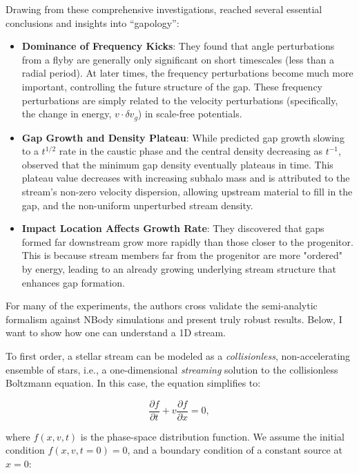             Drawing from these comprehensive investigations, \citet{2016MNRAS.457.3817S} reached several essential conclusions and insights into ``gapology'':
            \begin{itemize}
                \item \textbf{Dominance of Frequency Kicks}: They found that angle perturbations from a flyby are generally only significant on short timescales (less than a radial period). At later times, the frequency perturbations become much more important, controlling the future structure of the gap. These frequency perturbations are simply related to the velocity perturbations (specifically, the change in energy, $v \cdot \delta v_g$) in scale-free potentials.
                \item \textbf{Gap Growth and Density Plateau}: While \citet{2015MNRAS.450.1136E} predicted gap growth slowing to a $t^{1/2}$ rate in the caustic phase and the central density decreasing as $t^{-1}$, \citet{2016MNRAS.457.3817S} observed that the minimum gap density eventually plateaus in time. This plateau value decreases with increasing subhalo mass and is attributed to the stream's non-zero velocity dispersion, allowing upstream material to fill in the gap, and the non-uniform unperturbed stream density.
                \item \textbf{Impact Location Affects Growth Rate}: They discovered that gaps formed far downstream grow more rapidly than those closer to the progenitor. This is because stream members far from the progenitor are more "ordered" by energy, leading to an already growing underlying stream structure that enhances gap formation.
            \end{itemize}
            For many of the experiments, the authors cross validate the semi-analytic formalism against NBody simulations and present truly robust results. Below, I want to show how one can understand a 1D stream. 


            To first order, a stellar stream can be modeled as a \textit{collisionless}, non-accelerating ensemble of stars, i.e., a one-dimensional \textit{streaming} solution to the collisionless Boltzmann equation. In this case, the equation simplifies to:

            \begin{equation}
                \frac{\partial f}{\partial t} + v \frac{\partial f}{\partial x} = 0,
            \end{equation}

            where \( f(x,v,t) \) is the phase-space distribution function. We assume the initial condition \( f(x,v,t=0) = 0 \), and a boundary condition of a constant source at \( x=0 \):

